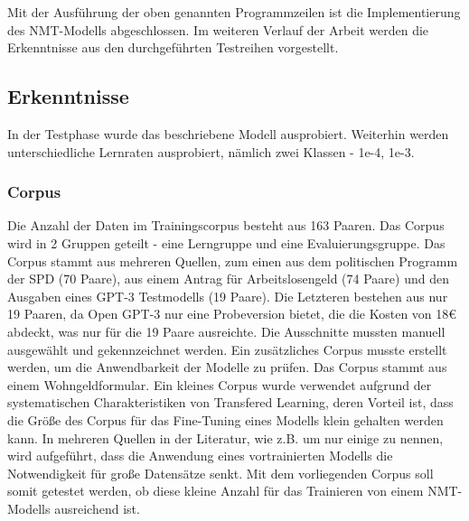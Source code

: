 %
%	
%	
%	

Mit der Ausführung der oben genannten Programmzeilen ist die Implementierung des NMT-Modells abgeschlossen. Im weiteren Verlauf der Arbeit werden die Erkenntnisse aus den durchgeführten Testreihen vorgestellt.

\subsection{Erkenntnisse}

In der Testphase wurde das beschriebene Modell ausprobiert. Weiterhin werden unterschiedliche Lernraten ausprobiert, nämlich zwei Klassen - 1e-4, 1e-3.

\subsubsection{Corpus} \label{corpus_def}
Die Anzahl der Daten im Trainingscorpus besteht aus 163 Paaren. Das Corpus wird in 2 Gruppen geteilt - eine Lerngruppe und eine Evaluierungsgruppe. Das Corpus stammt aus mehreren Quellen, zum einen aus dem politischen Programm der SPD (70 Paare), aus einem Antrag für Arbeitslosengeld (74 Paare) und den Ausgaben eines GPT-3 Testmodells (19 Paare). Die Letzteren bestehen aus nur 19 Paaren, da Open GPT-3 nur eine Probeversion bietet, die die Kosten von 18€ abdeckt, was nur für die 19 Paare ausreichte. Die Ausschnitte mussten manuell ausgewählt und gekennzeichnet werden. Ein zusätzliches Corpus musste erstellt werden, um die Anwendbarkeit der Modelle zu prüfen. Das Corpus stammt aus einem Wohngeldformular. Ein kleines Corpus wurde verwendet aufgrund der systematischen Charakteristiken von Transfered Learning, deren Vorteil ist, dass die Größe des Corpus für das Fine-Tuning eines Modells klein gehalten werden kann. In mehreren Quellen in der Literatur, wie z.B. \cite{Malte:2019,transfered_learning:22} um nur einige zu nennen, wird aufgeführt, dass die Anwendung eines vortrainierten Modells die Notwendigkeit für große Datensätze senkt. Mit dem vorliegenden Corpus soll somit getestet werden, ob diese kleine Anzahl für das Trainieren von einem NMT-Modells ausreichend ist.

